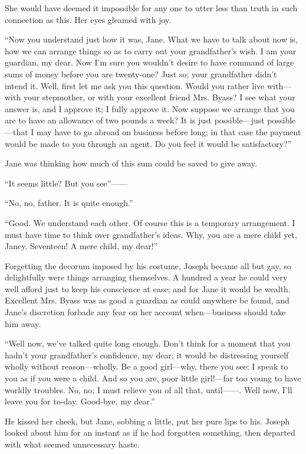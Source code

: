 She would have deemed it impossible for any one to utter less than truth
in such connection as this. Her eyes gleamed with joy.

``Now you understand just how it was, Jane. What we have to talk about
now is, how we can arrange things so as to carry out your grandfather's
wish. I am your guardian, my dear. Now I'm sure you wouldn't desire to
have command of large sums of money before you are twenty-one? Just so;
your {}grandfather didn't intend it. Well, first let me ask you this
question. Would you rather live with---with your stepmother, or with
your excellent friend Mrs. Byass? I see what your answer is, and I
approve it; I fully approve it. Now suppose we arrange that you are to
have an allowance of two pounds a week? It is just possible---just
possible---that I may have to go abroad on business before long; in that
case the payment would be made to you through an agent. Do you feel it
would be satisfactory?''

Jane was thinking how much of this sum could be saved to give away.

``It seems little? But you see''{{------}}

``No, no, father. It is quite enough.''

``Good. We understand each other. Of course this is a temporary
arrangement. I must have time to think over grandfather's ideas. Why,
you are a mere child yet, Janey. Seventeen! A mere child, my dear!''

Forgetting the decorum imposed by his costume, Joseph became all but
gay, so delightfully were things arranging themselves. A hundred a year
he could very well afford just to keep his conscience at ease; and for
Jane {}it would be wealth. Excellent Mrs. Byass was as good a guardian
as could anywhere be found, and Jane's discretion forbade any fear on
her account when---business should take him away.

``Well now, we've talked quite long enough. Don't think for a moment
that you hadn't your grandfather's confidence, my dear; it would be
distressing yourself wholly without reason---wholly. Be a good
girl---why, there you see; I speak to you as if you were a child. And so
you are, poor little girl!---far too young to have worldly troubles. No,
no; I must relieve you of all that, until{{------}}. Well now, I'll
leave you for to-day. Good-bye, my dear.''

He kissed her cheek, but Jane, sobbing a little, put her pure lips to
his. Joseph looked about him for an instant as if he had forgotten
something, then departed with what seemed unnecessary haste.

